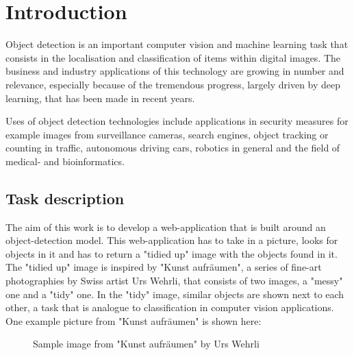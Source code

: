 \chapter{Introduction}
\label{Introduction}
Object detection is an important computer vision and machine learning task that consists in the localisation and classification of items within digital images. The business and industry applications of this technology are growing in number and relevance, especially because of the tremendous progress, largely driven by deep learning, that has been made in recent years.

Uses of object detection technologies include applications in security measures for example images from surveillance cameras, search engines, object tracking or counting in traffic, autonomous driving cars, robotics in general and the field of medical- and bioinformatics.

\section{Task description}
The aim of this work is to develop a web-application that is built around an object-detection model. This web-application has to take in a picture, looks for objects in it and has to return a "tidied up" image with the objects found in it. The "tidied up" image is inspired by "Kunst aufräumen", a series of fine-art photographies by Swiss artist Urs Wehrli, that consists of two images, a "messy" one and a "tidy" one. In the "tidy" image, similar objects are shown next to each other, a task that is analogue to classification in computer vision applications. One example picture from "Kunst aufräumen" is shown here:

\begin{figure}[H]
	\caption{\label{fig:kunst-aufraeumen-sample} Sample image from "Kunst aufräumen" by Urs Wehrli}
\end{figure}

